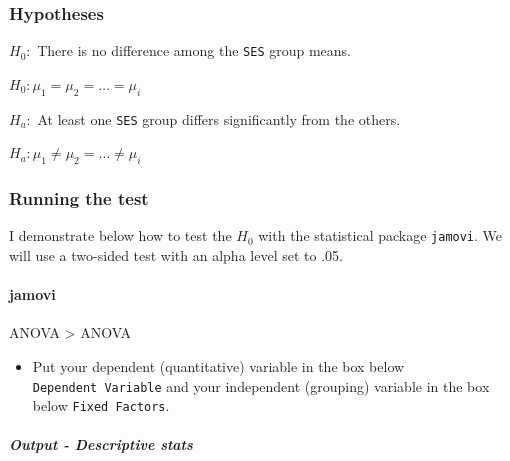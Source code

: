 \documentclass[
]{article}
\providecommand{\tightlist}{%
  \setlength{\itemsep}{0pt}\setlength{\parskip}{0pt}}
\begin{document}
\hypertarget{hypotheses}{%
\subsubsection{Hypotheses}\label{hypotheses}}

\(H_0:\) There is no difference among the \texttt{SES} group means.

\(H_0:\mu_1 = \mu_2 = \ldots = \mu_i\)

\(H_a:\) At least one \texttt{SES} group differs significantly from the others.

\(H_a:\mu_1 \neq \mu_2 = \ldots \neq \mu_i\)

\hypertarget{running-the-test}{%
\subsubsection{Running the test}\label{running-the-test}}

I demonstrate below how to test the \(H_0\) with the statistical package \texttt{jamovi}. We will use a two-sided test with an alpha level set to .05.

\hypertarget{jamovi}{%
\paragraph{jamovi}\label{jamovi}}

ANOVA \textgreater{} ANOVA

\begin{itemize}
\tightlist
\item
  Put your dependent (quantitative) variable in the box below \texttt{Dependent\ Variable} and your independent (grouping) variable in the box below \texttt{Fixed\ Factors}.
\end{itemize}

\hypertarget{output---descriptive-stats}{%
\subparagraph{Output - Descriptive stats}\label{output---descriptive-stats}}
\end{document}

